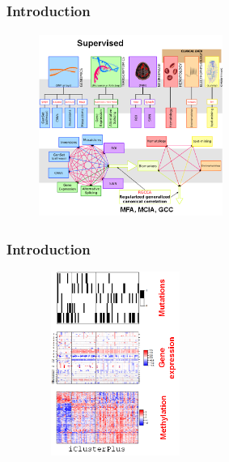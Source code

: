 \documentclass[10pt,xcolor=dvipsnames]{beamer}\usepackage[]{graphicx}\usepackage[]{color}
\begin{document}
\begin{frame}[plain]\frametitle{Introduction}

\begin{figure}
\begin{center}
 \includegraphics[height=6cm, width=6cm]{figures/supervised_multi_omic.png}
\end{center}
\end{figure}

\end{frame}



\begin{frame}[plain]\frametitle{Introduction}
 \begin{figure}
 \begin{center}
   \includegraphics[height=6cm, width=5cm]{figures/non_supervised_multi_omic.png}
  \end{center}
 \end{figure}
\end{frame}
\end{document}
